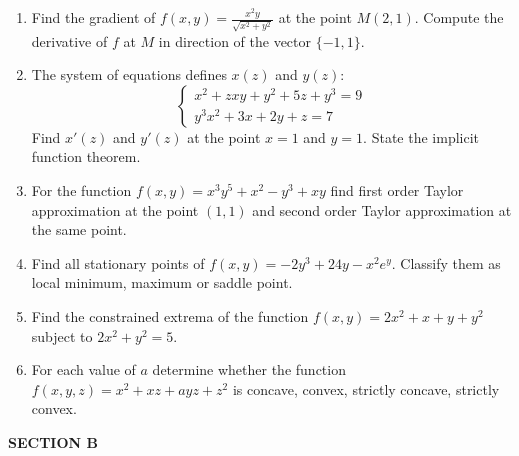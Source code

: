 \begin{enumerate}
	\item Find the gradient of $f(x,y) =\frac{x^2y}{\sqrt{x^2+y^2}}$
at the point $M(2,1)$. Compute the derivative of $f$ at $M$ in direction of the vector $\{-1, 1\}$.
	\item The system of equations defines $x(z)$ and $y(z)$:
\begin{equation}
\begin{cases}
x^2+zxy+y^2+5z+y^3=9 \\
y^3x^2+3x+2y+z=7 \nonumber
\end{cases}
\end{equation}
Find $x'(z)$ and $y'(z)$ at the point $x=1$ and $y=1$. State the implicit function theorem.
 \item For the function $f(x,y)=x^3y^5+x^2-y^3+xy$ find first order Taylor approximation at the point $(1,1)$ and second order Taylor approximation at the same point.
	\item Find all stationary points of $f(x,y) = -2y^3+24y-x^2e^y$. Classify them as local minimum, maximum or saddle point.
	\item Find the constrained extrema of the function $f(x,y)=2x^2+x+y+y^2$ subject to $2x^2+y^2=5$.
	\item  For each value of $a$ determine whether the function $f(x,y,z)=x^2+xz+ayz+z^2$ is concave, convex, strictly concave, strictly convex.
\end{enumerate}

\textbf{SECTION B}

